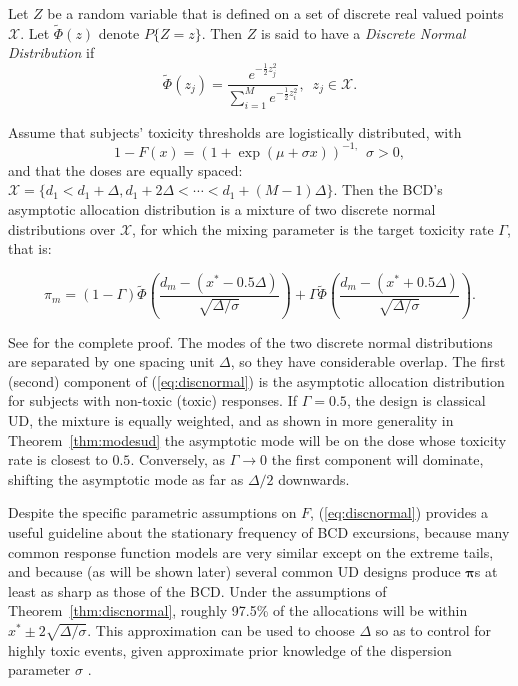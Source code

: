 \begin{defn}
Let $Z$ be a random variable that is defined on a set of discrete
real valued points $\mathcal{X}$.  Let $\tilde{\Phi}(z)$ denote $P\{Z=z\}$.  Then $Z$ is said to have a \emph{Discrete Normal Distribution} if
\begin{equation*}
\tilde{\Phi}(z_j)=\frac{e^{-\frac{1}{2}z_j^2}}{\sum_{i=1}^Me^{-\frac{1}{2}z_i^2}},\,\,\,z_j\in\mathcal{X}.
\end{equation*}
\end{defn}


\begin{thm}\label{thm:discnormal}
Assume that subjects' toxicity thresholds are logistically distributed, with $$1-F(x)=(1+\exp(\mu+\sigma x))^{-1,}\ \ \sigma>0,$$ and that the doses are equally spaced: $\mathcal{X}=\{d_1<d_1+\Delta,d_1+2\Delta<\cdots<d_1+(M-1)\Delta\}.$ Then the BCD's asymptotic allocation distribution is a mixture of two discrete normal distributions over $\mathcal{X}$,  for which the mixing parameter is the target toxicity rate $\Gamma$, that is:

\begin{equation}\label{eq:discnormal}
\pi_m=(1-\Gamma)\tilde{\Phi}\left(\frac{d_m-(x^*-0.5\Delta)}{\sqrt{\Delta/\sigma}}\right)+\Gamma\tilde{\Phi}\left(\frac{d_m-(x^*+0.5\Delta)}{\sqrt{\Delta/\sigma}}\right).
\end{equation}
\end{thm}

See \cite{Durh:Flou:rand:1994} for the complete proof. The modes of the two discrete normal distributions are separated by one spacing unit $\Delta$, so they have considerable overlap. The first (second) component of (\ref{eq:discnormal}) is the asymptotic allocation distribution for subjects with non-toxic (toxic) responses. If $\Gamma=0.5$, the design is classical UD, the mixture is equally weighted, and as shown in more generality in Theorem~\ref{thm:modesud} the asymptotic mode will be on the dose whose toxicity rate is closest to $0.5$. Conversely, as $\Gamma\to 0$ the first component will dominate, shifting the asymptotic mode as far as $\Delta/2$ downwards.

Despite the specific parametric assumptions on $F$,  (\ref{eq:discnormal}) provides a useful guideline about the stationary frequency of BCD excursions, because many common response function models are very similar except on the extreme tails, and because (as will be shown later) several common UD designs produce $\boldsymbol{\pi}$s at least as sharp as those of the BCD. Under the assumptions of Theorem~\ref{thm:discnormal}, roughly 97.5\% of the allocations will be within $x^*\pm 2\sqrt{\Delta/\sigma}$.  This approximation can be used to choose $\Delta$ so as to control for highly toxic events, given approximate prior knowledge of the dispersion parameter $\sigma$ \citep{Durh:Flou:Rose:rand:1997}.

